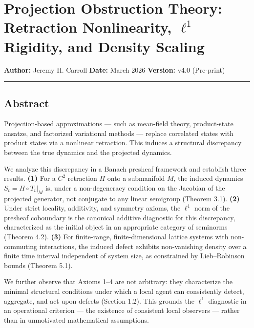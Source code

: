 \documentclass[
]{article}
\author{}
\date{}
\begin{document}
\section{\texorpdfstring{Projection Obstruction Theory: Retraction
Nonlinearity, \(\ell^1\) Rigidity, and Density
Scaling}{Projection Obstruction Theory: Retraction Nonlinearity, \textbackslash ell\^{}1 Rigidity, and Density Scaling}}\label{projection-obstruction-theory-retraction-nonlinearity-ell1-rigidity-and-density-scaling}

\textbf{Author:} Jeremy H. Carroll \textbf{Date:} March 2026
\textbf{Version:} v4.0 (Pre-print)

\begin{center}\rule{0.5\linewidth}{0.5pt}\end{center}

\subsection{Abstract}\label{abstract}

Projection-based approximations --- such as mean-field theory,
product-state ansatze, and factorized variational methods --- replace
correlated states with product states via a nonlinear retraction. This
induces a structural discrepancy between the true dynamics and the
projected dynamics.

We analyze this discrepancy in a Banach presheaf framework and establish
three results. \textbf{(1)} For a \(C^2\) retraction \(\Pi\) onto a
submanifold \(M\), the induced dynamics \(S_t = \Pi \circ T_t|_M\) is,
under a non-degeneracy condition on the Jacobian of the projected
generator, not conjugate to any linear semigroup (Theorem 3.1).
\textbf{(2)} Under strict locality, additivity, and symmetry axioms, the
\(\ell^1\) norm of the presheaf coboundary is the canonical additive
diagnostic for this discrepancy, characterized as the initial object in
an appropriate category of seminorms (Theorem 4.2). \textbf{(3)} For
finite-range, finite-dimensional lattice systems with non-commuting
interactions, the induced defect exhibits non-vanishing density over a
finite time interval independent of system size, as constrained by
Lieb--Robinson bounds (Theorem 5.1).

We further observe that Axioms 1--4 are not arbitrary: they characterize
the minimal structural conditions under which a local agent can
consistently detect, aggregate, and act upon defects (Section 1.2). This
grounds the \(\ell^1\) diagnostic in an operational criterion --- the
existence of consistent local observers --- rather than in unmotivated
mathematical assumptions.
\end{document}
